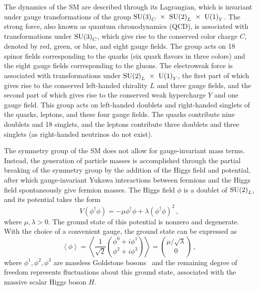 The dynamics of the SM are described through its Lagrangian, which is invariant under
gauge transformations of the group ${\rm SU(3)}_C~\times~{\rm SU(2)}_L~\times~{\rm U(1)}_Y$.
The strong force, also known as quantum chronodynamics (QCD),
is associated with transformations under ${\rm SU(3)}_C$, which give rise to
the conserved color charge $C$, denoted by red, green, or blue, and eight gauge fields.
The group acts on 18 spinor fields corresponding to the quarks (six quark flavors in three colors)
and the eight gauge fields corresponding to the gluons.
The electroweak force is associated with transformations under ${\rm SU(2)}_L~\times~{\rm U(1)}_Y$,
the first part of which gives rise to the conserved left-handed chirality $L$ and three gauge fields,
and the second part of which gives rise to the conserved weak hypercharge $Y$ and one gauge field.
This group acts on left-handed doublets and right-handed singlets of the quarks, leptons, and
these four gauge fields. The quarks contribute nine doublets and 18 singlets, and the leptons contribute
three doublets and three singlets (as right-handed neutrinos do not exist).

The symmetry group of the SM does not allow for gauge-invariant mass terms. Instead,
the generation of particle masses is accomplished through the partial breaking of the
symmetry group by the addition of the Higgs field and potential, after which gauge-invariant
Yukawa interactions between fermions and the Higgs field spontaneously give fermion masses.
The Higgs field $\phi$ is a doublet of ${\rm SU(2)}_L$, and its potential takes the form
\begin{equation}
V(\phi^\dagger\phi) = -\mu\phi^\dagger\phi + \lambda(\phi^\dagger\phi)^2 \,,
\end{equation}
where $\mu,\lambda > 0$. The ground state of this potential is nonzero and degenerate. With the
choice of a convenient gauge, the ground state can be expressed as
\begin{equation}
\left\langle \phi \right\rangle =
\left\langle \frac{1}{\sqrt{2}} {\phi^0+i\phi^1 \choose \phi^2+i\phi^3} \right\rangle =
{\mu / \sqrt{\lambda} \choose 0} \,,
\end{equation}
where $\phi^1, \phi^2, \phi^3$ are massless Goldstone
bosons~\cite{1961.Goldstone,1962.Goldstone-Salam-Weinberg.Broken-Symmetries} and the remaining
degree of freedom represents fluctuations about this ground state,
associated with the massive scalar Higgs boson $H$.


